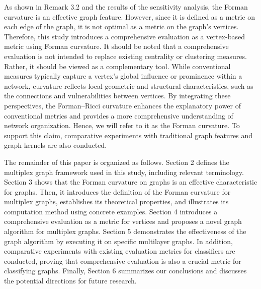 \documentclass[preprint,12pt,number]{elsarticle}
\theoremstyle{plain} %
\theoremstyle{definition} %
\begin{document}
As shown in Remark 3.2 and the results of the sensitivity analysis, the Forman curvature is an effective graph feature. However, since it is defined as a metric on each edge of the graph, it is not optimal as a metric on the graph's vertices. Therefore, this study introduces a comprehensive evaluation as a vertex-based metric using Forman curvature.
It should be noted that a comprehensive evaluation is not intended to replace existing centrality or clustering measures. Rather, it should be viewed as a complementary tool. While conventional measures typically capture a vertex's global influence or prominence within a network, curvature reflects local geometric and structural characteristics, such as the connections and vulnerabilities between vertices. By integrating these perspectives, the Forman--Ricci curvature enhances the explanatory power of conventional metrics and provides a more comprehensive understanding of network organization.
Hence, we will refer to it as the Forman curvature. To support this claim, comparative experiments with traditional graph features and graph kernels are also conducted.

The remainder of this paper is organized as follows.
Section 2 defines the multiplex graph framework used in this study, including relevant terminology. 
Section 3 shows that the Forman curvature on graphs is an effective characteristic for graphs. Then, it introduces the definition of the Forman curvature for multiplex graphs, establishes its theoretical properties, and illustrates its computation method using concrete examples. 
Section 4 introduces a comprehensive evaluation as a metric for vertices and proposes a novel graph algorithm for multiplex graphs. 
Section 5 demonstrates the effectiveness of the graph algorithm by executing it on specific multilayer graphs. In addition, comparative experiments with existing evaluation metrics for classifiers are conducted, proving that comprehensive evaluation is also a crucial metric for classifying graphs.
Finally, Section 6 summarizes our conclusions and discusses the potential directions for future research.

\end{document}
